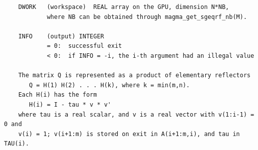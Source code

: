 \documentclass[10pt]{book}
\begin{document}
\begin{verbatim}
    DWORK   (workspace)  REAL array on the GPU, dimension N*NB,
            where NB can be obtained through magma_get_sgeqrf_nb(M).

    INFO    (output) INTEGER   
            = 0:  successful exit   
            < 0:  if INFO = -i, the i-th argument had an illegal value   

    The matrix Q is represented as a product of elementary reflectors   
       Q = H(1) H(2) . . . H(k), where k = min(m,n).   
    Each H(i) has the form   
       H(i) = I - tau * v * v'   
    where tau is a real scalar, and v is a real vector with v(1:i-1) = 0 and 
    v(i) = 1; v(i+1:m) is stored on exit in A(i+1:m,i), and tau in TAU(i).   
\end{verbatim}

\newpage
\end{document}
